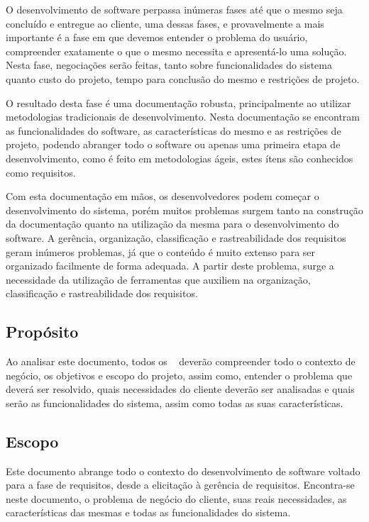 
O desenvolvimento de software perpassa inúmeras fases até que o mesmo seja concluído e entregue ao cliente, uma dessas fases, e provavelmente a mais importante é a fase em que devemos entender o problema do usuário, compreender exatamente o que o mesmo necessita e apresentá-lo uma solução. Nesta fase, negociações serão feitas, tanto sobre funcionalidades do sistema quanto custo do projeto, tempo para conclusão do mesmo e restrições de projeto.

O resultado desta fase é uma documentação robusta, principalmente ao utilizar metodologias tradicionais de desenvolvimento. Nesta documentação se encontram as funcionalidades do software, as características do mesmo e as restrições de projeto, podendo abranger todo o software ou apenas uma primeira etapa de desenvolvimento, como é feito em metodologias ágeis, estes ítens são conhecidos como requisitos.

Com esta documentação em mãos, os desenvolvedores podem começar o desenvolvimento do sistema, porém muitos problemas surgem tanto na construção da documentação quanto na utilização da mesma para o desenvolvimento do software. A gerência, organização, classificação e rastreabilidade dos requisitos geram inúmeros problemas, já que o conteúdo é muito extenso para ser organizado facilmente de forma adequada. A partir deste problema, surge a necessidade da utilização de ferramentas que auxiliem na organização, classificação e rastreabilidade dos requisitos.

\subsection{Propósito}

Ao analisar este documento, todos os \stakeholder~ deverão compreender todo o contexto de negócio, os objetivos e escopo do projeto, assim como, entender o problema que deverá ser resolvido, quais necessidades do cliente deverão ser analisadas e quais serão as funcionalidades do sistema, assim como todas as suas características.

\subsection{Escopo}

Este documento abrange todo o contexto do desenvolvimento de software voltado para a fase de requisitos, desde a elicitação à gerência de requisitos. Encontra-se neste documento, o problema de negócio do cliente, suas reais necessidades, as características das mesmas e todas as funcionalidades do sistema.

